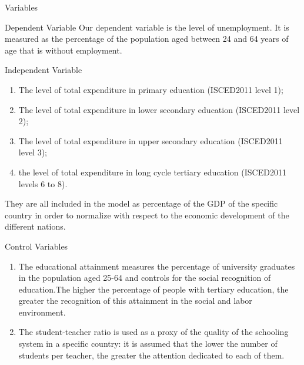 \documentclass[
  ignorenonframetext,
]{beamer}
\providecommand{\tightlist}{%
  \setlength{\itemsep}{0pt}\setlength{\parskip}{0pt}}
\begin{document}
\begin{frame}{Variables}
\protect\hypertarget{variables}{}
\begin{block}{Dependent Variable}
\protect\hypertarget{dependent-variable}{}
Our dependent variable is the level of unemployment. It is measured as
the percentage of the population aged between 24 and 64 years of age
that is without employment.
\end{block}

\begin{block}{Independent Variable}
\protect\hypertarget{independent-variable}{}
\begin{enumerate}
\tightlist
\item
  The level of total expenditure in primary education (ISCED2011 level
  1);
\item
  The level of total expenditure in lower secondary education (ISCED2011
  level 2);
\item
  The level of total expenditure in upper secondary education (ISCED2011
  level 3);
\item
  the level of total expenditure in long cycle tertiary education
  (ISCED2011 levels 6 to 8).
\end{enumerate}

They are all included in the model as percentage of the GDP of the
specific country in order to normalize with respect to the economic
development of the different nations.
\end{block}
\end{frame}

\begin{frame}{Control Variables}
\protect\hypertarget{control-variables}{}
\begin{enumerate}
\tightlist
\item
  The educational attainment measures the percentage of university
  graduates in the population aged 25-64 and controls for the social
  recognition of education.The higher the percentage of people with
  tertiary education, the greater the recognition of this attainment in
  the social and labor environment.
\item
  The student-teacher ratio is used as a proxy of the quality of the
  schooling system in a specific country: it is assumed that the lower
  the number of students per teacher, the greater the attention
  dedicated to each of them.
\end{enumerate}
\end{frame}
\end{document}
